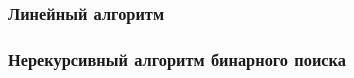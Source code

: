 \documentclass{bmstu}
\begin{document}
\subsubsection{Линейный алгоритм}


\subsubsection{Нерекурсивный алгоритм бинарного поиска}
\end{document}

